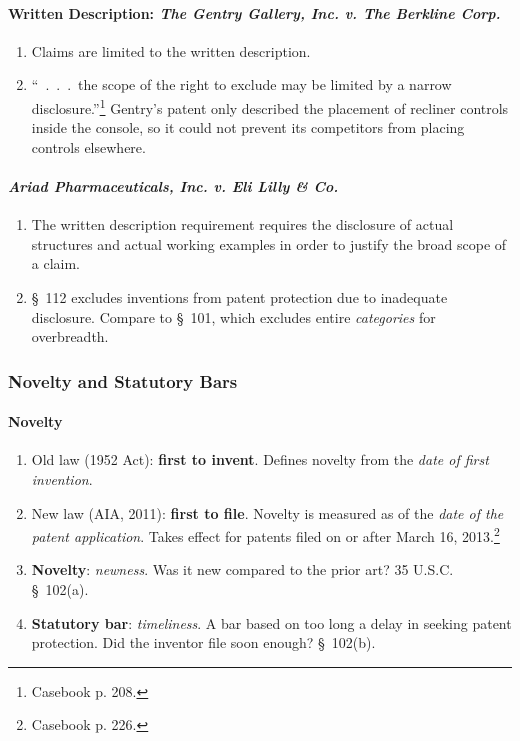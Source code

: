 \paragraph{Written Description: \emph{The Gentry Gallery, Inc. v. 
The Berkline Corp.}}

\begin{enumerate}
    \item Claims are limited to the written description.
    \item ``~.~.~.~the scope of the right to exclude may be limited by a 
    narrow disclosure.''\footnote{Casebook p. 208.} Gentry's patent only 
    described the placement of recliner controls inside the console, so it 
    could not prevent its competitors from placing controls elsewhere.
\end{enumerate}

\paragraph{\emph{Ariad Pharmaceuticals, Inc. v. Eli Lilly \& Co.}} %

\begin{enumerate}
    \item The written description requirement requires the disclosure of 
    actual structures and actual working examples in order to justify the 
    broad scope of a claim.
    \item \S\ 112 excludes inventions from patent protection due to inadequate 
    disclosure. Compare to \S\ 101, which excludes entire \emph{categories} 
    for overbreadth.
\end{enumerate}


\subsubsection{Novelty and Statutory Bars}

\paragraph{Novelty}

\begin{enumerate}
    \item Old law (1952 Act): \textbf{first to invent}. Defines novelty from 
    the \emph{date of first invention}.
    \item New law (AIA, 2011): \textbf{first to file}. Novelty is measured as 
    of the \emph{date of the patent application}. Takes effect for patents 
    filed on or after March 16, 2013.\footnote{Casebook p. 226.}
    \item \textbf{Novelty}: \emph{newness}. Was it new compared to the prior 
    art? 35 U.S.C. \S\ 102(a).
    \item \textbf{Statutory bar}: \emph{timeliness}. A bar based on too long a 
    delay in seeking patent protection. Did the inventor file soon enough? \S\ 
    102(b).
\end{enumerate}

